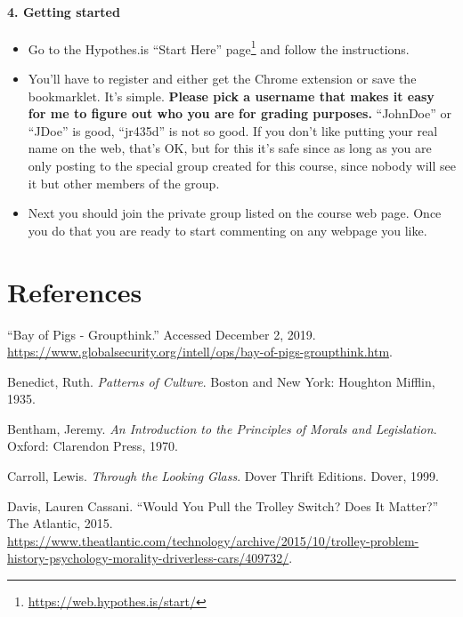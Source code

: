 \documentclass[
  12pt, openany]{book}
\renewcommand{\href}[2]{#2\footnote{\url{#1}}}
\theoremstyle{definition}
\theoremstyle{definition}
\theoremstyle{definition}
\theoremstyle{definition}
\theoremstyle{remark}
\begin{document}
\hypertarget{getting-started}{%
\subsubsection*{4. Getting started}\label{getting-started}}


\begin{itemize}
\item
  Go to the Hypothes.is \href{https://web.hypothes.is/start/}{``Start Here'' page} and follow the instructions.
\item
  You'll have to register and either get the Chrome extension or save the bookmarklet. It's simple. \textbf{Please pick a username that makes it easy for me to figure out who you are for grading purposes.} ``JohnDoe'' or ``JDoe'' is good, ``jr435d'' is not so good. If you don't like putting your real name on the web, that's OK, but for this it's safe since as long as you are only posting to the special group created for this course, since nobody will see it but other members of the group.
\item
  Next you should join the private group listed on the course web page. Once you do that you are ready to start commenting on any webpage you like.
\end{itemize}

\hypertarget{references}{%
\chapter*{References}\label{references}}


\hypertarget{refs}{}
\leavevmode\hypertarget{ref-BayPigsGroupthink}{}%
``Bay of Pigs - Groupthink.'' Accessed December 2, 2019. \url{https://www.globalsecurity.org/intell/ops/bay-of-pigs-groupthink.htm}.

\leavevmode\hypertarget{ref-benedictPatternsCulture1935}{}%
Benedict, Ruth. \emph{Patterns of Culture}. Boston and New York: Houghton Mifflin, 1935.

\leavevmode\hypertarget{ref-benthamIntroductionPrinciplesMorals1970}{}%
Bentham, Jeremy. \emph{An Introduction to the Principles of Morals and Legislation}. Oxford: Clarendon Press, 1970.

\leavevmode\hypertarget{ref-carrollLookingGlass1999}{}%
Carroll, Lewis. \emph{Through the Looking Glass}. Dover Thrift Editions. Dover, 1999.

\leavevmode\hypertarget{ref-davisWouldYouPull2015}{}%
Davis, Lauren Cassani. ``Would You Pull the Trolley Switch? Does It Matter?'' The Atlantic, 2015. \url{https://www.theatlantic.com/technology/archive/2015/10/trolley-problem-history-psychology-morality-driverless-cars/409732/}.
\end{document}
